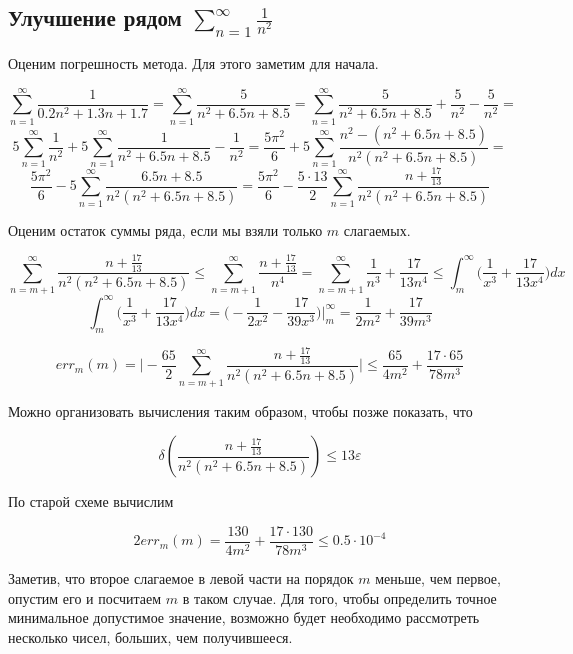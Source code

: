 \documentclass[11pt,a4paper,oneside]{article}
\begin{document}
\subsection{Улучшение рядом $ \sum_{n = 1}^{\infty} \frac{1}{n^2} $}
	
Оценим погрешность метода. Для этого заметим для начала.

$$ \sum_{n = 1}^{\infty} \frac{1}{0.2n^2 + 1.3n + 1.7} =
	\sum_{n = 1}^{\infty} \frac{5}{n^2 + 6.5n + 8.5} =
	\sum_{n = 1}^{\infty} \frac{5}{n^2 + 6.5n + 8.5} + \frac{5}{n^2} - \frac{5}{n^2} = $$
$$ 5 \sum_{n = 1}^{\infty} \frac{1}{n^2} +
	5 \sum_{n = 1}^{\infty} \frac{1}{n^2 + 6.5n + 8.5} - \frac{1}{n^2} = 
	\frac{5\pi^2}{6} +
	5 \sum_{n = 1}^{\infty} \frac{n^2 - (n^2 + 6.5n + 8.5)}{n^2 (n^2 + 6.5n + 8.5)} = $$
$$ \frac{5\pi^2}{6} -
	5 \sum_{n = 1}^{\infty} \frac{6.5n + 8.5}{n^2 (n^2 + 6.5n + 8.5)} = 
	\frac{5\pi^2}{6} -
	\frac{5 \cdot 13}{2} \sum_{n = 1}^{\infty} \frac{n + \frac{17}{13}}{n^2 (n^2 + 6.5n + 8.5)}$$
	
Оценим остаток суммы ряда, если мы взяли только $m$ слагаемых.

$$ \sum_{n = m + 1}^{\infty} \frac{n + \frac{17}{13}}{n^2 (n^2 + 6.5n + 8.5)} \le
	\sum_{n = m + 1}^{\infty} \frac{n + \frac{17}{13}}{n^4} = 
	\sum_{n = m + 1}^{\infty} \frac{1}{n^3} + \frac{17}{13 n^4} \le
	\int_{m}^{\infty} \biggr(\frac{1}{x^3} + \frac{17}{13 x^4}\biggr)dx $$
$$ \int_{m}^{\infty} \biggr(\frac{1}{x^3} + \frac{17}{13 x^4}\biggr) dx
	= \biggr( - \frac{1}{2x^2} - \frac{17}{39 x^3} \biggr) \biggr|_{m}^{\infty} =
	\frac{1}{2 m^2} + \frac{17}{39 m^3} $$
	
$$ err_{m}(m) =
	\biggr|-\frac{65}{2} \sum_{n = m + 1}^{\infty}
		\frac{n + \frac{17}{13}}{n^2 (n^2 + 6.5n + 8.5)}\biggr| \le
	\frac{65}{4m^2} + \frac{17 \cdot 65}{78m^3} $$
	
Можно организовать вычисления таким образом, чтобы позже показать, что

$$ \delta \left( \frac{n + \frac{17}{13}}{n^2 (n^2 + 6.5n + 8.5)} \right) \le 13 \varepsilon $$
	
По старой схеме вычислим

$$ 2 err_{m}(m) = \frac{130}{4m^2} + \frac{17 \cdot 130}{78m^3} \le 0.5 \cdot 10^{-4} $$

Заметив, что второе слагаемое в левой части на порядок $m$ меньше, чем первое, опустим его и посчитаем $m$ в таком случае. Для того, чтобы определить точное минимальное допустимое значение, возможно будет необходимо рассмотреть несколько чисел, больших, чем получившееся.
\end{document}
